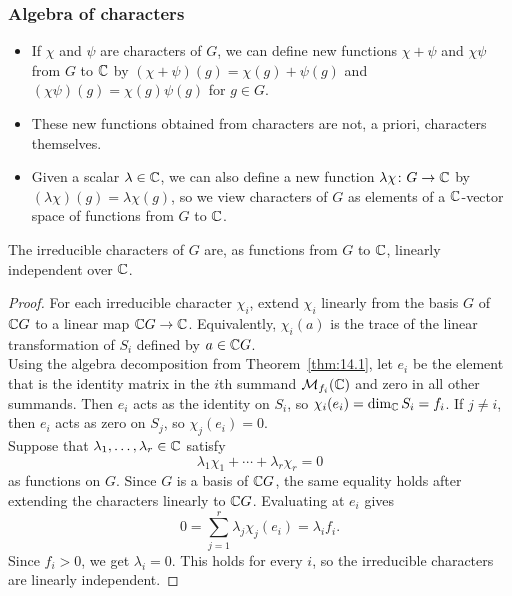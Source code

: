\documentclass[../Odyssey_Project.tex]{subfiles}
\begin{document}
\subsubsection*{Algebra of characters}
\begin{itemize}
    \item If $\chi$ and $\psi$ are characters of $G$, we can define new functions $\chi + \psi$ and $\chi\psi$ from $G$ to $\mathbb{C}$ by $(\chi + \psi)(g) = \chi(g) + \psi(g)$ and $(\chi\psi)(g) = \chi(g)\psi(g)$ for $g \in G$.
    \item These new functions obtained from characters are not, a priori, characters themselves.
    \item Given a scalar $\lambda \in \mathbb{C}$, we can also define a new function $\lambda \chi \colon G \to \mathbb{C}$ by $(\lambda \chi)(g) = \lambda \chi(g)$, so we view characters of $G$ as elements of a $\mathbb{C}$-vector space of functions from $G$ to $\mathbb{C}$.
\end{itemize}

\begin{proposition}
\label{prop:14.5}
The irreducible characters of $G$ are, as functions from $G$ to $\mathbb{C}$, linearly independent over $\mathbb{C}$.
\end{proposition}
\begin{proof}
    For each irreducible character $\chi_i$, extend $\chi_i$ linearly from the basis $G$ of $\mathbb{C} G$ to a linear map $\mathbb{C} G \to \mathbb{C}$. Equivalently, $\chi_i(a)$ is the trace of the linear transformation of $S_i$ defined by $a \in \mathbb{C} G$.\\
    Using the algebra decomposition from Theorem~\ref{thm:14.1}, let $e_i$ be the element that is the identity matrix in the $i$th summand $\mathcal{M}_{f_i}(\mathbb{C})$ and zero in all other summands. Then $e_i$ acts as the identity on $S_i$, so $\chi_i(e_i)=\dim_{\mathbb{C}}S_i=f_i$. If $j \neq i$, then $e_i$ acts as zero on $S_j$, so $\chi_j(e_i)=0$.\\
    Suppose that $\lambda_1,\ldots,\lambda_r \in \mathbb{C}$ satisfy
    \[
        \lambda_1\chi_1+\cdots+\lambda_r\chi_r=0
    \]
    as functions on $G$. Since $G$ is a basis of $\mathbb{C} G$, the same equality holds after extending the characters linearly to $\mathbb{C} G$. Evaluating at $e_i$ gives
    \[
        0=\sum_{j=1}^{r}\lambda_j\chi_j(e_i)=\lambda_i f_i.
    \]
    Since $f_i>0$, we get $\lambda_i=0$. This holds for every $i$, so the irreducible characters are linearly independent.
\end{proof}
\end{document}
